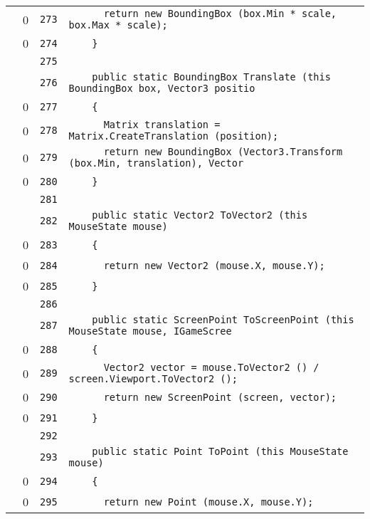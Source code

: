 \documentclass[a4paper,10pt]{article}
\begin{document}
\begin{longtable}[l]{lrrl}
\cellcolor{red} & 0 & \verb~273~ & \verb~      return new BoundingBox (box.Min * scale, box.Max * scale);~\\
\cellcolor{red} & 0 & \verb~274~ & \verb~    }~\\
\cellcolor{gray} &  & \verb~275~ & \verb~~\\
\cellcolor{gray} &  & \verb~276~ & \verb~    public static BoundingBox Translate (this BoundingBox box, Vector3 positio~\\
\cellcolor{red} & 0 & \verb~277~ & \verb~    {~\\
\cellcolor{red} & 0 & \verb~278~ & \verb~      Matrix translation = Matrix.CreateTranslation (position);~\\
\cellcolor{red} & 0 & \verb~279~ & \verb~      return new BoundingBox (Vector3.Transform (box.Min, translation), Vector~\\
\cellcolor{red} & 0 & \verb~280~ & \verb~    }~\\
\cellcolor{gray} &  & \verb~281~ & \verb~~\\
\cellcolor{gray} &  & \verb~282~ & \verb~    public static Vector2 ToVector2 (this MouseState mouse)~\\
\cellcolor{red} & 0 & \verb~283~ & \verb~    {~\\
\cellcolor{red} & 0 & \verb~284~ & \verb~      return new Vector2 (mouse.X, mouse.Y);~\\
\cellcolor{red} & 0 & \verb~285~ & \verb~    }~\\
\cellcolor{gray} &  & \verb~286~ & \verb~~\\
\cellcolor{gray} &  & \verb~287~ & \verb~    public static ScreenPoint ToScreenPoint (this MouseState mouse, IGameScree~\\
\cellcolor{red} & 0 & \verb~288~ & \verb~    {~\\
\cellcolor{red} & 0 & \verb~289~ & \verb~      Vector2 vector = mouse.ToVector2 () / screen.Viewport.ToVector2 ();~\\
\cellcolor{red} & 0 & \verb~290~ & \verb~      return new ScreenPoint (screen, vector);~\\
\cellcolor{red} & 0 & \verb~291~ & \verb~    }~\\
\cellcolor{gray} &  & \verb~292~ & \verb~~\\
\cellcolor{gray} &  & \verb~293~ & \verb~    public static Point ToPoint (this MouseState mouse)~\\
\cellcolor{red} & 0 & \verb~294~ & \verb~    {~\\
\cellcolor{red} & 0 & \verb~295~ & \verb~      return new Point (mouse.X, mouse.Y);~\\

\end{longtable}
\end{document}
